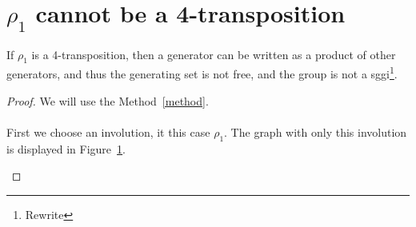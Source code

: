 \section{$\rho_1$ cannot be a 4-transposition}

\begin{theorem}
  \label{exclude-1}
  If $\rho_1$ is a 4-transposition, then a generator can be written as a product of other generators, and thus the generating set is not free, and the group is not a sggi\footnote{Rewrite}.
\end{theorem}

\begin{proof}
We will use the Method~\ref{method}.

\paragraph{}
First we choose an involution, it this case $\rho_1$. The graph with only this involution is displayed in Figure~\ref{proof-5-1}.

\begin{figure}[H]
  \begin{center}
    \caption{}
    \label{proof-5-1}
  \end{center}
\end{figure}


\end{proof}
